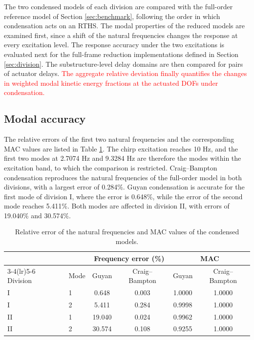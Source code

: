 \documentclass[a4paper,fleqn,review,12pt]{cas-sc}
\newcommand{\rev}[1]{\textcolor{red}{#1}}
\begin{document}
The two condensed models of each division are compared with the full-order reference model of Section \ref{sec:benchmark}, following the order in which condensation acts on an RTHS. The modal properties of the reduced models are examined first, since a shift of the natural frequencies changes the response at every excitation level. The response accuracy under the two excitations is evaluated next for the full-frame reduction implementations defined in Section \ref{sec:division}. The substructure-level delay domains are then compared for pairs of actuator delays. \rev{The aggregate relative deviation finally quantifies the changes in weighted modal kinetic energy fractions at the actuated DOFs under condensation.}

\subsection{Modal accuracy}
\label{sec:modal-accuracy}

The relative errors of the first two natural frequencies and the corresponding MAC values are listed in Table \ref{tab:modal}. The chirp excitation reaches 10 Hz, and the first two modes at 2.7074 Hz and 9.3284 Hz are therefore the modes within the excitation band, to which the comparison is restricted. Craig--Bampton condensation reproduces the natural frequencies of the full-order model in both divisions, with a largest error of 0.284\%. Guyan condensation is accurate for the first mode of division I, where the error is 0.648\%, while the error of the second mode reaches 5.411\%. Both modes are affected in division II, with errors of 19.040\% and 30.574\%.

\begin{table}[htbp]
	\centering
	\caption{Relative error of the natural frequencies and MAC values of the condensed models.}
	\label{tab:modal}
	\begin{tabular}{llcccc}
		\toprule
		& & \multicolumn{2}{c}{Frequency error (\%)} & \multicolumn{2}{c}{MAC}\\
		\cmidrule(lr){3-4}\cmidrule(lr){5-6}
		Division & Mode & Guyan & Craig--Bampton & Guyan & Craig--Bampton\\
		\midrule
		I  & 1 & 0.648  & 0.003 & 1.0000 & 1.0000\\
		I  & 2 & 5.411  & 0.284 & 0.9998 & 1.0000\\
		\midrule
		II & 1 & 19.040 & 0.024 & 0.9962 & 1.0000\\
		II & 2 & 30.574 & 0.108 & 0.9255 & 1.0000\\
		\bottomrule
	\end{tabular}
\end{table}
\end{document}
